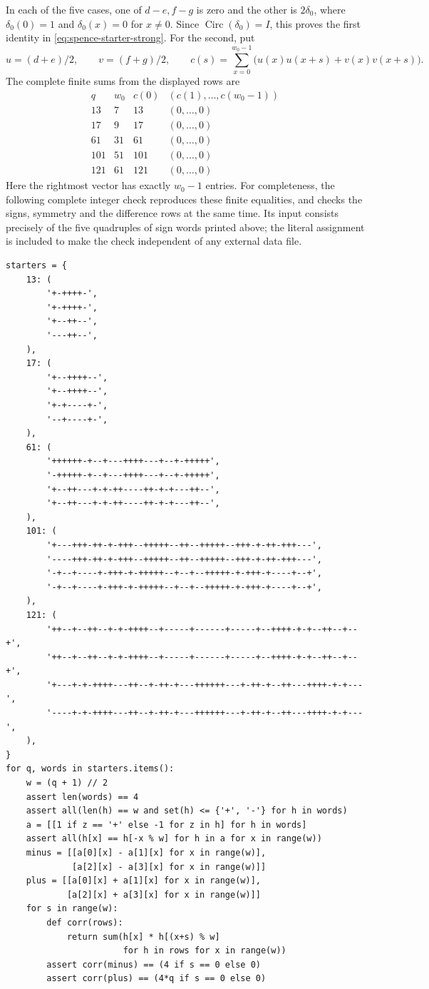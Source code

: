 \documentclass[10pt]{article}
\begin{document}
In each of the five cases, one of $d-e,f-g$ is zero and the other is
$2\delta_0$, where $\delta_0(0)=1$ and $\delta_0(x)=0$ for $x\ne0$.
Since $\operatorname{Circ}(\delta_0)=I$, this proves the first identity in
\eqref{eq:spence-starter-strong}. For the second, put
\[
 u=(d+e)/2,\qquad v=(f+g)/2,\qquad
 c(s)=\sum_{x=0}^{w_0-1}\bigl(u(x)u(x+s)+v(x)v(x+s)\bigr).
\]
The complete finite sums from the displayed rows are
\[
\begin{array}{c|r|r|c}
 q&w_0&c(0)&(c(1),\ldots,c(w_0-1))\\\hline
 13&7&13&(0,\ldots,0)\\
 17&9&17&(0,\ldots,0)\\
 61&31&61&(0,\ldots,0)\\
 101&51&101&(0,\ldots,0)\\
 121&61&121&(0,\ldots,0)
\end{array}
\]
Here the rightmost vector has exactly $w_0-1$ entries. For completeness,
the following complete integer check reproduces these finite equalities,
and checks the signs, symmetry and the difference rows at the same time.
Its input consists precisely of the five quadruples of sign words printed above;
the literal assignment is included to make the check independent of any
external data file.
\begin{verbatim}
starters = {
    13: (
        '+-++++-',
        '+-++++-',
        '+--++--',
        '---++--',
    ),
    17: (
        '+--++++--',
        '+--++++--',
        '+-+----+-',
        '--+----+-',
    ),
    61: (
        '++++++-+--+---++++---+--+-+++++',
        '-+++++-+--+---++++---+--+-+++++',
        '+--++---+-+-++----++-+-+---++--',
        '+--++---+-+-++----++-+-+---++--',
    ),
    101: (
        '+---+++-++-+-+++--+++++--++--+++++--+++-+-++-+++---',
        '----+++-++-+-+++--+++++--++--+++++--+++-+-++-+++---',
        '-+--+----+-+++-+-+++++--+--+--+++++-+-+++-+----+--+',
        '-+--+----+-+++-+-+++++--+--+--+++++-+-+++-+----+--+',
    ),
    121: (
        '++--+--++--+-+-++++--+-----+------+-----+--++++-+-+--++--+--+',
        '++--+--++--+-+-++++--+-----+------+-----+--++++-+-+--++--+--+',
        '+---+-+-++++---++--+-++-+---++++++---+-++-+--++---++++-+-+---',
        '----+-+-++++---++--+-++-+---++++++---+-++-+--++---++++-+-+---',
    ),
}
for q, words in starters.items():
    w = (q + 1) // 2
    assert len(words) == 4
    assert all(len(h) == w and set(h) <= {'+', '-'} for h in words)
    a = [[1 if z == '+' else -1 for z in h] for h in words]
    assert all(h[x] == h[-x % w] for h in a for x in range(w))
    minus = [[a[0][x] - a[1][x] for x in range(w)],
             [a[2][x] - a[3][x] for x in range(w)]]
    plus = [[a[0][x] + a[1][x] for x in range(w)],
            [a[2][x] + a[3][x] for x in range(w)]]
    for s in range(w):
        def corr(rows):
            return sum(h[x] * h[(x+s) % w]
                       for h in rows for x in range(w))
        assert corr(minus) == (4 if s == 0 else 0)
        assert corr(plus) == (4*q if s == 0 else 0)
\end{verbatim}
\end{document}
